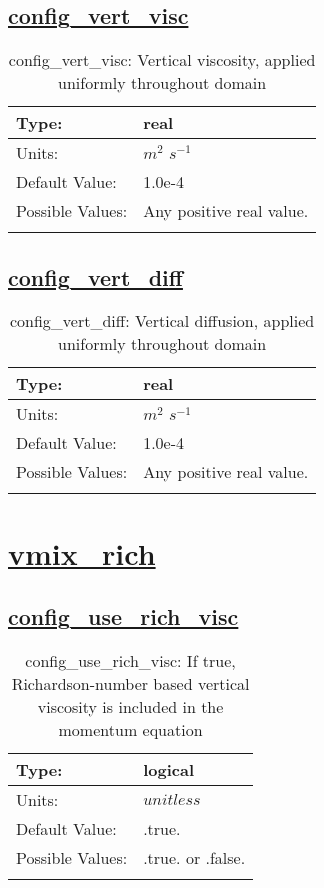 \subsection[config\_vert\_visc]{\hyperref[sec:nm_tab_vmix_const]{config\_vert\_visc}}
\label{subsec:nm_sec_config_vert_visc}
\begin{center}
\begin{longtable}{| p{2.0in} | p{4.0in} |}
    \hline
    Type: & real \\
    \hline
    Units: & $m^2$ $s^{-1}$ \\
    \hline
    Default Value: & 1.0e-4 \\
    \hline
    Possible Values: & Any positive real value. \\
    \hline
    \caption{config\_vert\_visc: Vertical viscosity, applied uniformly throughout domain}
\end{longtable}
\end{center}
\subsection[config\_vert\_diff]{\hyperref[sec:nm_tab_vmix_const]{config\_vert\_diff}}
\label{subsec:nm_sec_config_vert_diff}
\begin{center}
\begin{longtable}{| p{2.0in} | p{4.0in} |}
    \hline
    Type: & real \\
    \hline
    Units: & $m^2$ $s^{-1}$ \\
    \hline
    Default Value: & 1.0e-4 \\
    \hline
    Possible Values: & Any positive real value. \\
    \hline
    \caption{config\_vert\_diff: Vertical diffusion, applied uniformly throughout domain}
\end{longtable}
\end{center}
\section[vmix\_rich]{\hyperref[sec:nm_tab_vmix_rich]{vmix\_rich}}
\label{sec:nm_sec_vmix_rich}
\subsection[config\_use\_rich\_visc]{\hyperref[sec:nm_tab_vmix_rich]{config\_use\_rich\_visc}}
\label{subsec:nm_sec_config_use_rich_visc}
\begin{center}
\begin{longtable}{| p{2.0in} | p{4.0in} |}
    \hline
    Type: & logical \\
    \hline
    Units: & $unitless$ \\
    \hline
    Default Value: & .true. \\
    \hline
    Possible Values: & .true. or .false. \\
    \hline
    \caption{config\_use\_rich\_visc: If true, Richardson-number based vertical viscosity is included in the momentum equation}
\end{longtable}
\end{center}
